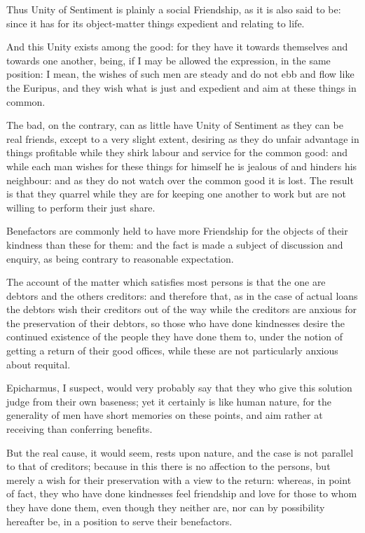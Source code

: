 Thus Unity of Sentiment is plainly a social Friendship, as it is also said to
be: since it has for its object-matter things expedient and relating to life.

And this Unity exists among the good: for they have it towards themselves and
towards one another, being, if I may be allowed the expression, in the same
position: I mean, the wishes of such men are steady and do not ebb and flow
like the Euripus, and they wish what is just and expedient and aim at these
things in common.

The bad, on the contrary, can as little have Unity of Sentiment as they can be
real friends, except to a very slight extent, desiring as they do unfair
advantage in things profitable while they shirk labour and service for the
common good: and while each man wishes for these things for himself he is
jealous of and hinders his neighbour: and as they do not watch over the common
good it is lost. The result is that they quarrel while they are for keeping one
another to work but are not willing to perform their just share.


Benefactors are commonly held to have more Friendship for the objects of their
kindness than these for them: and the fact is made a subject of discussion and
enquiry, as being contrary to reasonable expectation.

The account of the matter which satisfies most persons is that the one are
debtors and the others creditors: and therefore that, as in the case of actual
loans the debtors wish their creditors out of the way while the creditors are
anxious for the preservation of their debtors, so those who have done
kindnesses desire the continued existence of the people they have done them to,
under the notion of getting a return of their good offices, while these are not
particularly anxious about requital.

Epicharmus, I suspect, would very probably say that they who give this solution
judge from their own baseness; yet it certainly is like human nature, for the
generality of men have short memories on these points, and aim rather at
receiving than conferring benefits.

But the real cause, it would seem, rests upon nature, and the case is not
parallel to that of creditors; because in this there is no affection to the
persons, but merely a wish for their preservation with a view to the return:
whereas, in point of fact, they who have done kindnesses feel friendship and
love for those to whom they have done them, even though they neither are, nor
can by possibility hereafter be, in a position to serve their benefactors.

